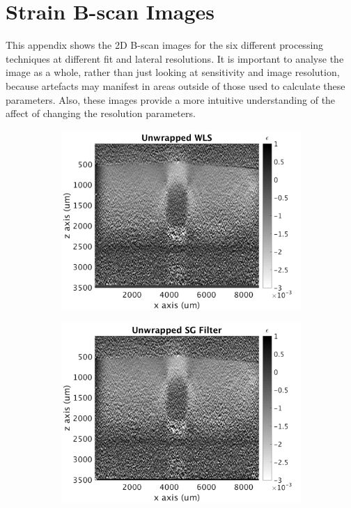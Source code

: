 \chapter{Strain B-scan Images}\label{images}

This appendix shows the 2D B-scan images for the six different processing techniques at different fit and lateral resolutions. It is important to analyse the image as a whole, rather than just looking at sensitivity and image resolution, because artefacts may manifest in areas outside of those used to calculate these parameters. Also, these images provide a more intuitive understanding of the affect of changing the resolution parameters.

\begin{figure}[h]
	\centering
    \begin{subfigure}{0.49\textwidth}
    	\centering
        \includegraphics[width=\textwidth]{appendix_figs/wls_fr40_lr0.png}
    \end{subfigure}
    \begin{subfigure}{0.49\textwidth}
    	\centering
        \includegraphics[width=\textwidth]{appendix_figs/uwsg_fr40_lr0.png}

\end{subfigure}
\end{figure}
